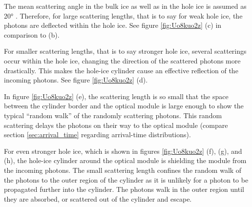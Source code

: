 The mean scattering angle in the bulk ice as well as in the hole ice is assumed as \ang{20} \cite{escawiki}. Therefore, for large scattering lengths, that is to say for weak hole ice, the photons are deflected within the hole ice. See figure \ref{fig:Uo8kuo2z} (c) in comparison to (b).

For smaller scattering lengths, that is to say stronger hole ice, several scatterings occur within the hole ice, changing the direction of the scattered photons more drastically. This makes the hole-ice cylinder cause an effective reflection of the incoming photons. See figure \ref{fig:Uo8kuo2z} (d).

In figure \ref{fig:Uo8kuo2z} (e), the scattering length is so small that the space between the cylinder border and the optical module is large enough to show the typical ``random walk'' of the randomly scattering photons. This random scattering delays the photons on their way to the optical module (compare section \ref{sec:arrival_time} regarding arrival-time distributions).

For even stronger hole ice, which is shown in figures \ref{fig:Uo8kuo2z} (f), (g), and (h), the hole-ice cylinder around the optical module is shielding the module from the incoming photons. The small scattering length confines the random walk of the photons to the outer region of the cylinder as it is unlikely for a photon to be propagated further into the cylinder. The photons walk in the outer region until they are absorbed, or scattered out of the cylinder and escape.

